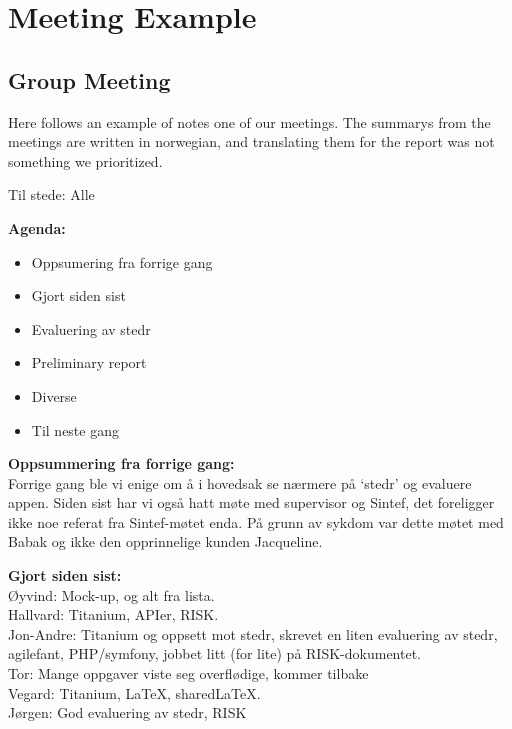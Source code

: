 \section{Meeting Example}

\subsection{Group Meeting}
Here follows an example of notes one of our meetings. The summarys from the meetings are written in norwegian, and translating them for the report was not something we prioritized.\\

\clearpage
{}

Til stede: Alle

\textbf{Agenda:}
\begin{itemize}
\item Oppsumering fra forrige gang
\item Gjort siden sist
\item Evaluering av stedr
\item Preliminary report
\item Diverse
\item Til neste gang
\end{itemize}

\textbf{Oppsummering fra forrige gang:}\\
Forrige gang ble vi enige om å i hovedsak se nærmere på ‘stedr’ og evaluere appen. Siden sist har vi også hatt møte med supervisor og Sintef, det foreligger ikke noe referat fra Sintef-møtet enda. På grunn av sykdom var dette møtet med Babak og ikke den opprinnelige kunden Jacqueline.  

\textbf{Gjort siden sist:}\\
Øyvind: Mock-up, og alt fra lista.\\
Hallvard: Titanium, APIer, RISK.  \\
Jon-Andre: Titanium og oppsett mot stedr, skrevet en liten evaluering av stedr, agilefant, PHP/symfony, jobbet litt (for lite) på RISK-dokumentet.  \\
Tor: Mange oppgaver viste seg overflødige, kommer tilbake\\
Vegard: Titanium, LaTeX, sharedLaTeX.\\
Jørgen: God evaluering av stedr, RISK\\

